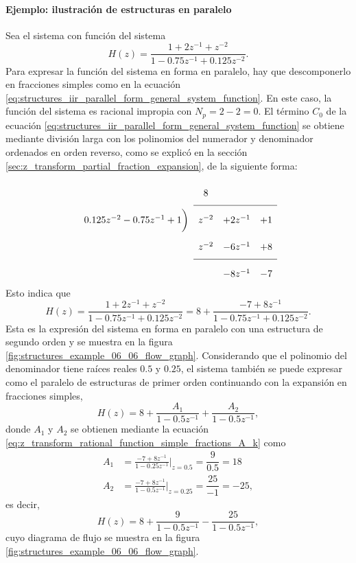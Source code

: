 \documentclass[a4paper]{report}
\begin{document}
\paragraph{Ejemplo: ilustración de estructuras en paralelo} Sea el sistema con función del sistema
\[
 H(z)=\dfrac{1+2z^{-1}+z^{-2}}{1-0.75z^{-1}+0.125z^{-2}}.
\]
Para expresar la función del sistema en forma en paralelo, hay que descomponerlo en fracciones simples como en la ecuación \ref{eq:structures_iir_parallel_form_general_system_function}. En este caso, la función del sistema es racional impropia con \(N_p=2-2=0\). El término \(C_0\) de la ecuación \ref{eq:structures_iir_parallel_form_general_system_function} se obtiene mediante división larga con los polinomios del numerador y denominador ordenados en orden reverso, como se explicó en la sección \ref{sec:z_transform_partial_fraction_expansion}, de la siguiente forma:
\[
\setlength\extrarowheight{10pt}
\begin{array}[t]{cccc}
                       & 8 &   &    \\[\medskipamount]
\cline{2-4}
0.125z^{-2}-0.75z^{-1}+1 
                \bigg) & z^{-2} & +2z^{-1} & +1 \\
                       & z^{-2} & -6z^{-1} & +8  \\[\medskipamount]
\cline{2-4}
                       &    & -8z^{-1} & -7  
\end{array}
\]
Esto indica que 
\[
 H(z)=\dfrac{1+2z^{-1}+z^{-2}}{1-0.75z^{-1}+0.125z^{-2}}=8+\dfrac{-7+8z^{-1}}{1-0.75z^{-1}+0.125z^{-2}}.
\]
Esta es la expresión del sistema en forma en paralelo con una estructura de segundo orden y se muestra en la figura \ref{fig:structures_example_06_06_flow_graph}. Considerando que el polinomio del denominador tiene raíces reales \(0.5\) y \(0.25\), el sistema también se puede expresar como el paralelo de estructuras de primer orden continuando con la expansión en fracciones simples,
\[
 H(z)=8+\dfrac{A_1}{1-0.5z^{-1}}+\dfrac{A_2}{1-0.5z^{-1}},
\]
donde \(A_1\) y \(A_2\) se obtienen mediante la ecuación \ref{eq:z_transform_rational_function_simple_fractions_A_k} como
\begin{align*}
 A_1&=\frac{-7+8z^{-1}}{1-0.25z^{-1}}\bigg|_{z=0.5}=\dfrac{9}{0.5}=18\\
 A_2&=\frac{-7+8z^{-1}}{1-0.5z^{-1}}\bigg|_{z=0.25}=\dfrac{25}{-1}=-25,
\end{align*}
es decir,
\[
 H(z)=8+\dfrac{9}{1-0.5z^{-1}}-\dfrac{25}{1-0.5z^{-1}},
\]
cuyo diagrama de flujo se muestra en la figura \ref{fig:structures_example_06_06_flow_graph}.
\end{document}
